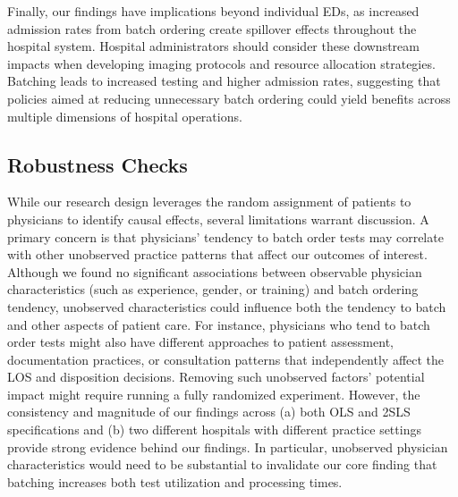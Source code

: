 \documentclass[,,nonblindrev]{informs}
\begin{document}
Finally, our findings have implications beyond individual EDs, as
increased admission rates from batch ordering create spillover effects
throughout the hospital system. Hospital administrators should consider
these downstream impacts when developing imaging protocols and resource
allocation strategies. Batching leads to increased testing and higher
admission rates, suggesting that policies aimed at reducing unnecessary
batch ordering could yield benefits across multiple dimensions of
hospital operations.

\subsection{Robustness Checks}\label{sec:robustness}

While our research design leverages the random assignment of patients to
physicians to identify causal effects, several limitations warrant
discussion. A primary concern is that physicians' tendency to batch
order tests may correlate with other unobserved practice patterns that
affect our outcomes of interest. Although we found no significant
associations between observable physician characteristics (such as
experience, gender, or training) and batch ordering tendency, unobserved
characteristics could influence both the tendency to batch and other
aspects of patient care. For instance, physicians who tend to batch
order tests might also have different approaches to patient assessment,
documentation practices, or consultation patterns that independently
affect the LOS and disposition decisions. Removing such unobserved
factors' potential impact might require running a fully randomized
experiment. However, the consistency and magnitude of our findings
across (a) both OLS and 2SLS specifications and (b) two different
hospitals with different practice settings provide strong evidence
behind our findings. In particular, unobserved physician characteristics
would need to be substantial to invalidate our core finding that
batching increases both test utilization and processing times.
\end{document}
